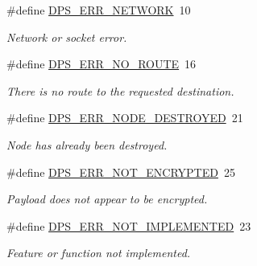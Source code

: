 \begin{DoxyCompactItemize}
\#define \hyperlink{group__status_ga80a0ccafe770ca4149e65300d870c0d9}{D\+P\+S\+\_\+\+E\+R\+R\+\_\+\+N\+E\+T\+W\+O\+RK}~10
\begin{DoxyCompactList}\small\item\em Network or socket error. \end{DoxyCompactList}\item 
\mbox{\label{group__status_ga934517e91f6e214fb6cab5089d5acc92}} 
\#define \hyperlink{group__status_ga934517e91f6e214fb6cab5089d5acc92}{D\+P\+S\+\_\+\+E\+R\+R\+\_\+\+N\+O\+\_\+\+R\+O\+U\+TE}~16
\begin{DoxyCompactList}\small\item\em There is no route to the requested destination. \end{DoxyCompactList}\item 
\mbox{\label{group__status_ga9047d1e219f2a62a948845d922582ec5}} 
\#define \hyperlink{group__status_ga9047d1e219f2a62a948845d922582ec5}{D\+P\+S\+\_\+\+E\+R\+R\+\_\+\+N\+O\+D\+E\+\_\+\+D\+E\+S\+T\+R\+O\+Y\+ED}~21
\begin{DoxyCompactList}\small\item\em Node has already been destroyed. \end{DoxyCompactList}\item 
\mbox{\label{group__status_gac13dac4973f6700ff95461171148c1c8}} 
\#define \hyperlink{group__status_gac13dac4973f6700ff95461171148c1c8}{D\+P\+S\+\_\+\+E\+R\+R\+\_\+\+N\+O\+T\+\_\+\+E\+N\+C\+R\+Y\+P\+T\+ED}~25
\begin{DoxyCompactList}\small\item\em Payload does not appear to be encrypted. \end{DoxyCompactList}\item 
\mbox{\label{group__status_gad175cd9050dec5f3a214bc62c3c7473c}} 
\#define \hyperlink{group__status_gad175cd9050dec5f3a214bc62c3c7473c}{D\+P\+S\+\_\+\+E\+R\+R\+\_\+\+N\+O\+T\+\_\+\+I\+M\+P\+L\+E\+M\+E\+N\+T\+ED}~23
\begin{DoxyCompactList}\small\item\em Feature or function not implemented. \end{DoxyCompactList}\item 
\mbox{\label{group__status_ga92b1c68aa4f1526347ccb76aa9382d76}} 

\end{DoxyCompactItemize}
